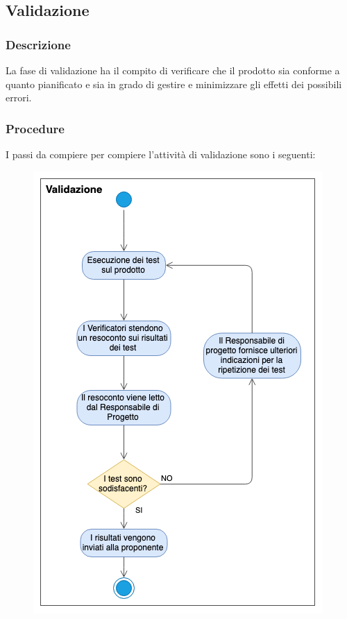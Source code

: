\subsection{Validazione}\label{validazione}
\subsubsection{Descrizione}
La fase di validazione ha il compito di verificare che il prodotto sia conforme a quanto pianificato e sia in grado di gestire e minimizzare gli effetti dei possibili errori.
\subsubsection{Procedure}
I passi da compiere per compiere l'attività di validazione sono i seguenti:
\begin{figure}[H]
	\begin{center}
		\includegraphics[scale=0.7]{./images/Validazione.png}
	\end{center} 
\end{figure}
